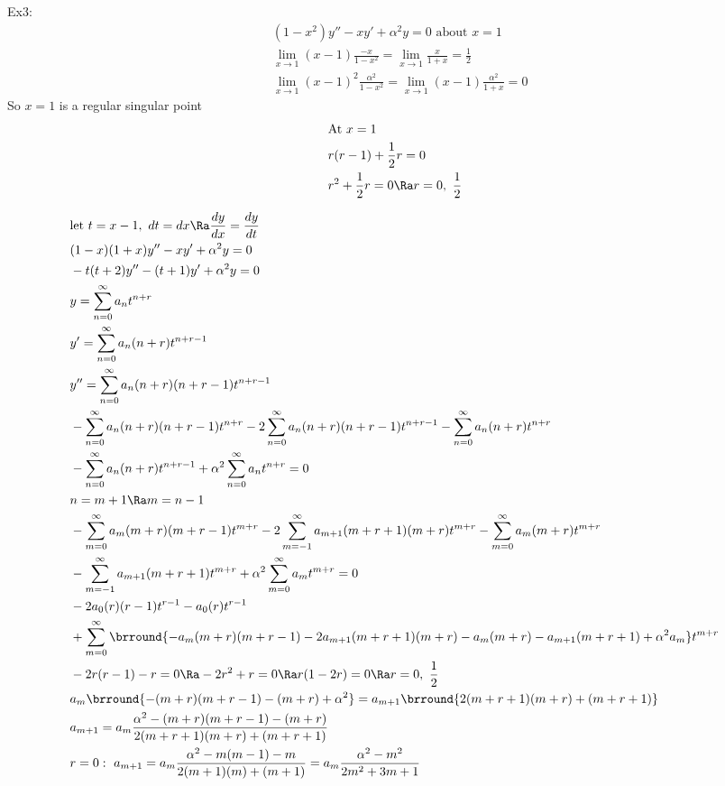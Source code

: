 Ex3:
\begin{align*}
    &(1-x^2)y''-xy'+\alpha^2y=0\text{ about $x=1$}\\
    &\lim_{x\to1}(x-1)\frac{-x}{1-x^2}=\lim_{x\to1}\frac{x}{1+x}=\frac{1}{2}\\
    &\lim_{x\to1}(x-1)^2\frac{\alpha^2}{1-x^2}=\lim_{x\to1}(x-1)\frac{\alpha^2}{1+x}=0
\end{align*}
So $x=1$ is a regular singular point
\begin{align*}
    &\text{At }x=1\\
    &r(r-1)+\frac{1}{2}r=0\\
    &r^2+\frac{1}{2}r=0\Ra r=0,\ \frac{1}{2}
\end{align*}
\begin{small}
\begin{align*}
    &\text{let }t=x-1,\ dt=dx\Ra \frac{dy}{dx}=\frac{dy}{dt}\\
    &(1-x)(1+x)y''-xy'+\alpha^2y=0\\
    &-t(t+2)y''-(t+1)y'+\alpha^2y=0\\
    &y=\sum_{n=0}^\infty a_nt^{n+r}\\
    &y'=\sum_{n=0}^\infty a_n(n+r)t^{n+r-1}\\
    &y''=\sum_{n=0}^\infty a_n(n+r)(n+r-1)t^{n+r-1}\\
    &-\sum_{n=0}^\infty a_n(n+r)(n+r-1)t^{n+r}-2\sum_{n=0}^\infty a_n(n+r)(n+r-1)t^{n+r-1}-\sum_{n=0}^\infty a_n(n+r)t^{n+r}\\
    &-\sum_{n=0}^\infty a_n(n+r)t^{n+r-1}+\alpha^2\sum_{n=0}^\infty a_nt^{n+r}=0\\
    &n=m+1\Ra m=n-1\\
    &-\sum_{m=0}^\infty a_m(m+r)(m+r-1)t^{m+r}-2\sum_{m=-1}^\infty a_{m+1}(m+r+1)(m+r)t^{m+r}-\sum_{m=0}^\infty a_m(m+r)t^{m+r}\\
    &-\sum_{m=-1}^\infty a_{m+1}(m+r+1)t^{m+r}+\alpha^2\sum_{m=0}^\infty a_mt^{m+r}=0\\
    &-2a_0(r)(r-1)t^{r-1}-a_0(r)t^{r-1}\\
    &+\sum_{m=0}^\infty \brround{-a_m(m+r)(m+r-1)-2a_{m+1}(m+r+1)(m+r)-a_m(m+r)-a_{m+1}(m+r+1)+\alpha^2 a_m}t^{m+r}\\
    &-2r(r-1)-r=0\Ra -2r^2+r=0\Ra r(1-2r)=0\Ra r=0,\ \frac{1}{2}\\
    &a_m\brround{-(m+r)(m+r-1)-(m+r)+\alpha^2}=a_{m+1}\brround{2(m+r+1)(m+r)+(m+r+1)}\\
    &a_{m+1}=a_m\frac{\alpha^2-(m+r)(m+r-1)-(m+r)}{2(m+r+1)(m+r)+(m+r+1)}\\
    &r=0:\ a_{m+1}=a_m\frac{\alpha^2-m(m-1)-m}{2(m+1)(m)+(m+1)}=a_m\frac{\alpha^2-m^2}{2m^2+3m+1}\\

\end{align*}
\end{small}
